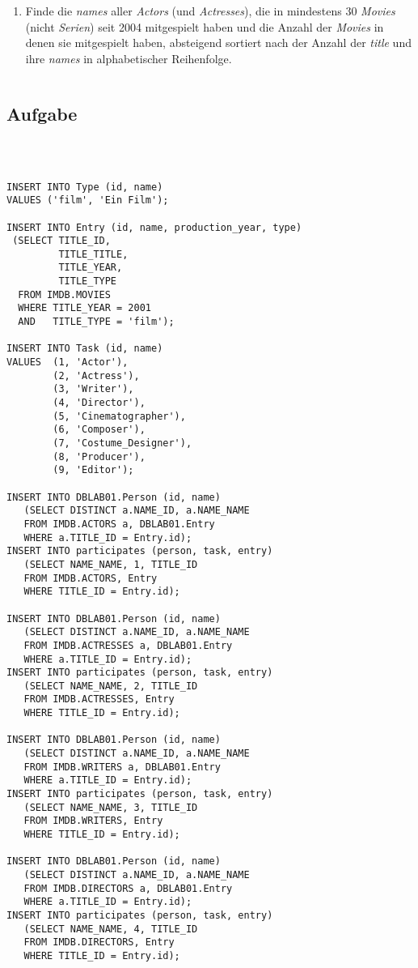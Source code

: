 \documentclass[11pt,a4paper,DIV=9]{scrartcl}
\newcounter{temp}
\newcommand{\aufgabe}[1]{
  \setcounter{temp}{\value{subsection}}
  \setcounter{subsection}{#1}
  \addtocounter{subsection}{-1}
  \subsection{Aufgabe}
  \setcounter{subsection}{\value{temp}}
}
\begin{document}
\begin{enumerate}
\item Finde die \textit{names} aller \textit{Actors} (und \textit{Actresses}), die in mindestens 30 \textit{Movies} (nicht \textit{Serien}) seit 2004 mitgespielt haben und die Anzahl der \textit{Movies} in denen sie mitgespielt haben, absteigend sortiert nach der Anzahl der \textit{title} und ihre \textit{names} in alphabetischer Reihenfolge.
\begin{lstlisting}
\end{lstlisting}
\end{enumerate}

\aufgabe{4}
\begin{lstlisting}



INSERT INTO Type (id, name)
VALUES ('film', 'Ein Film');

INSERT INTO Entry (id, name, production_year, type)
 (SELECT TITLE_ID,
         TITLE_TITLE,
         TITLE_YEAR,
         TITLE_TYPE
  FROM IMDB.MOVIES
  WHERE TITLE_YEAR = 2001
  AND   TITLE_TYPE = 'film');

INSERT INTO Task (id, name)
VALUES  (1, 'Actor'),
        (2, 'Actress'),
        (3, 'Writer'),
        (4, 'Director'),
        (5, 'Cinematographer'),
        (6, 'Composer'),
        (7, 'Costume_Designer'),
        (8, 'Producer'),
        (9, 'Editor');

INSERT INTO DBLAB01.Person (id, name)
   (SELECT DISTINCT a.NAME_ID, a.NAME_NAME
   FROM IMDB.ACTORS a, DBLAB01.Entry
   WHERE a.TITLE_ID = Entry.id);
INSERT INTO participates (person, task, entry)
   (SELECT NAME_NAME, 1, TITLE_ID
   FROM IMDB.ACTORS, Entry
   WHERE TITLE_ID = Entry.id);

INSERT INTO DBLAB01.Person (id, name)
   (SELECT DISTINCT a.NAME_ID, a.NAME_NAME
   FROM IMDB.ACTRESSES a, DBLAB01.Entry
   WHERE a.TITLE_ID = Entry.id);
INSERT INTO participates (person, task, entry)
   (SELECT NAME_NAME, 2, TITLE_ID
   FROM IMDB.ACTRESSES, Entry
   WHERE TITLE_ID = Entry.id);

INSERT INTO DBLAB01.Person (id, name)
   (SELECT DISTINCT a.NAME_ID, a.NAME_NAME
   FROM IMDB.WRITERS a, DBLAB01.Entry
   WHERE a.TITLE_ID = Entry.id);
INSERT INTO participates (person, task, entry)
   (SELECT NAME_NAME, 3, TITLE_ID
   FROM IMDB.WRITERS, Entry
   WHERE TITLE_ID = Entry.id);

INSERT INTO DBLAB01.Person (id, name)
   (SELECT DISTINCT a.NAME_ID, a.NAME_NAME
   FROM IMDB.DIRECTORS a, DBLAB01.Entry
   WHERE a.TITLE_ID = Entry.id);
INSERT INTO participates (person, task, entry)
   (SELECT NAME_NAME, 4, TITLE_ID
   FROM IMDB.DIRECTORS, Entry
   WHERE TITLE_ID = Entry.id);


\end{lstlisting}
\end{document}

